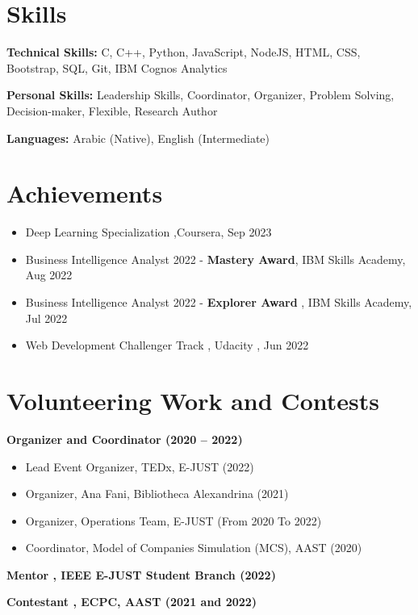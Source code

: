 \documentclass[letterpaper,11pt]{article}
\newcommand{\resumeItem}[1]{
  \item\small{
    {#1 \vspace{-2pt}}
  }
}
\newcommand{\resumeSubHeadingListStart}{\begin{itemize}[leftmargin=0.15in, label={}]}
\newcommand{\resumeSubHeadingListEnd}{\end{itemize}}
\newcommand{\resumeItemListStart}{\begin{itemize}}
\newcommand{\resumeItemListEnd}{\end{itemize}\vspace{-5pt}}
\begin{document}

\section{Skills}
  \resumeSubHeadingListStart
    \small{\item{
        \textbf{Technical Skills:}{ C, C++, Python, JavaScript, NodeJS, HTML, CSS, Bootstrap, SQL, Git, IBM Cognos Analytics} \\ \vspace{3pt}
        
        \textbf{Personal Skills:}{ Leadership Skills, Coordinator, Organizer, Problem Solving, Decision-maker, Flexible, Research Author} \\ \vspace{3pt} 
        
        \textbf{Languages:}{ Arabic (Native), English (Intermediate)}\\ \vspace{3pt}
        
    }}
  \resumeSubHeadingListEnd



\section{Achievements}
    \resumeItemListStart
                 \resumeItem{Deep Learning Specialization ,Coursera, Sep 2023}
                \resumeItem{Business Intelligence Analyst 2022 - \textbf{Mastery Award}, IBM Skills Academy, Aug 2022}
                \resumeItem{Business Intelligence Analyst 2022 - \textbf{Explorer Award} , IBM Skills Academy, Jul 2022}
                \resumeItem{{Web Development Challenger Track} {, Udacity} {, Jun 2022}  }
\resumeItemListEnd



        

    
\section{Volunteering Work and Contests}

\textbf{{Organizer and Coordinator} {(2020 -- 2022)}}{}{}
    \resumeItemListStart
        \resumeItem{Lead Event Organizer, TEDx, E-JUST (2022)}
        \resumeItem{Organizer, Ana Fani, Bibliotheca Alexandrina (2021)}
        \resumeItem{Organizer, Operations Team, E-JUST (From 2020 To 2022)}
        \resumeItem{Coordinator, Model of Companies Simulation (MCS), AAST (2020)}
\resumeItemListEnd
    
    \textbf{{Mentor} {, IEEE E-JUST Student Branch}{} {(2022)}}  
    
    \textbf{{Contestant} {, ECPC, AAST} {} {(2021 and 2022)} }


    
\end{document}
